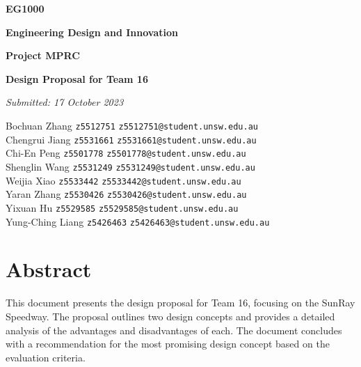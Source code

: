 \documentclass[12pt]{article}
\begin{document}
\begin{titlepage}
    \centering
    \vspace{1cm}
    {\Large \textbf{EG1000} \par}
    \vspace{0.5cm}
    {\Large \textbf{Engineering Design and Innovation} \par}
    \vspace{4cm}
    {\Huge \textbf{Project MPRC} \par}
    \vspace{0.8cm}
    {\Large \textbf{Design Proposal for Team 16} \par}
    \vfill
    {\large \textit{Submitted: 17 October 2023} \par}
    \vspace{1cm}
    \begin{tabbing}
        Bochuan Zhang \hspace{2cm} \= \texttt{z5512751} \hspace{2cm} \= \texttt{z5512751@student.unsw.edu.au} \\[10pt]
        Chengrui Jiang\> \texttt{z5531661} \> \texttt{z5531661@student.unsw.edu.au} \\[10pt]
        Chi-En Peng \> \texttt{z5501778} \> \texttt{z5501778@student.unsw.edu.au} \\[10pt]
        Shenglin Wang \> \texttt{z5531249} \> \texttt{z5531249@student.unsw.edu.au} \\[10pt]
        Weijia Xiao \> \texttt{z5533442} \> \texttt{z5533442@student.unsw.edu.au} \\[10pt]
        Yaran Zhang \> \texttt{z5530426} \> \texttt{z5530426@student.unsw.edu.au} \\[10pt]
        Yixuan Hu \> \texttt{z5529585} \> \texttt{z5529585@student.unsw.edu.au} \\[10pt]
        Yung-Ching Liang \> \texttt{z5426463} \> \texttt{z5426463@student.unsw.edu.au} \\[10pt]
    \end{tabbing}
    \vfill
\end{titlepage}

\newpage

\section*{Abstract}
This document presents the design proposal for Team 16, focusing on the SunRay Speedway. The proposal outlines two design concepts and provides a detailed analysis of the advantages and disadvantages of each. The document concludes with a recommendation for the most promising design concept based on the evaluation criteria.
\end{document}
